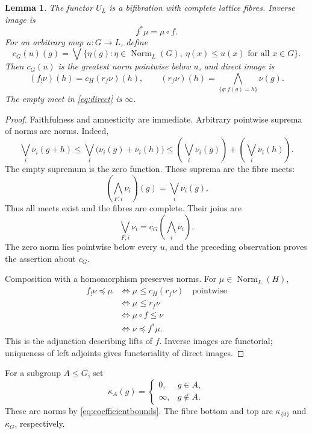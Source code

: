 \documentclass[12pt,a4paper]{amsart}
\newtheorem{lemma}[theorem]{Lemma}
\theoremstyle{definition}
\newcommand{\Norm}{\operatorname{Norm}}
\begin{document}
\begin{lemma}\label{lem:bifibration}
The functor $U_L$ is a bifibration with complete lattice fibres. Inverse image is
\[
                             f^*\mu=\mu\circ f.
\]
For an arbitrary map $u:G\to L$, define
\begin{equation}\label{eq:closure}
 c_G(u)(g)=
 \bigvee\{\eta(g):\eta\in\Norm_L(G),\ \eta(x)\leq u(x)\text{ for all }x\in G\}.
\end{equation}
Then $c_G(u)$ is the greatest norm pointwise below $u$, and direct image is
\begin{equation}\label{eq:direct}
 (f_!\nu)(h)=c_H(r_f\nu)(h),\qquad
 (r_f\nu)(h)=\bigwedge_{\{g:f(g)=h\}}\nu(g).
\end{equation}
The empty meet in \eqref{eq:direct} is $\infty$.
\end{lemma}
\begin{proof}
Faithfulness and amnesticity are immediate. Arbitrary pointwise suprema of norms are norms. Indeed,
\[
 \bigvee_i\nu_i(g+h)
 \leq\bigvee_i\bigl(\nu_i(g)+\nu_i(h)\bigr)
 \leq\left(\bigvee_i\nu_i(g)\right)+
      \left(\bigvee_i\nu_i(h)\right).
\]
The empty supremum is the zero function. These suprema are the fibre meets:
\[
                  \left(\bigwedge_{F,i}\nu_i\right)(g)
                          =\bigvee_i\nu_i(g).
\]
Thus all meets exist and the fibres are complete. Their joins are
\[
                         \bigvee_{F,i}\nu_i
                         =c_G\!\left(\bigwedge_i\nu_i\right).
\]
The zero norm lies pointwise below every $u$, and the preceding observation proves the assertion about $c_G$.

Composition with a homomorphism preserves norms. For $\mu\in\Norm_L(H)$,
\[
 \begin{aligned}
 f_!\nu\preceq \mu
 &\Longleftrightarrow \mu\leq c_H(r_f\nu)\quad\text{pointwise}\\
 &\Longleftrightarrow \mu\leq r_f\nu\\
 &\Longleftrightarrow \mu\circ f\leq\nu\\
 &\Longleftrightarrow \nu\preceq f^*\mu.
 \end{aligned}
\]
This is the adjunction describing lifts of $f$. Inverse images are functorial; uniqueness of left adjoints gives functoriality of direct images.
\end{proof}

For a subgroup $A\leq G$, set
\begin{equation}\label{eq:characteristic}
 \kappa_A(g)=
 \begin{cases}
 0,&g\in A,\\
 \infty,&g\notin A.
 \end{cases}
\end{equation}
These are norms by \eqref{eq:coefficientbounds}. The fibre bottom and top are $\kappa_{\{0\}}$ and $\kappa_G$, respectively.
\end{document}
